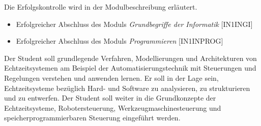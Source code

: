 \begin{course}

\setdoclanguagegerman
{}



\coursehead


\label{cour_6213.dp_997}


\begin{styleenv}
\begin{assessment}
Die Erfolgskontrolle wird in der Modulbeschreibung erläutert.


\end{assessment}

\begin{conditions}\begin{itemize}\item Erfolgreicher Abschluss des Moduls \emph{Grundbegriffe der Informatik} [IN1INGI]  \item Erfolgreicher Abschluss des Moduls \emph{Programmieren} [IN1INPROG]  \end{itemize}\end{conditions}


\end{styleenv}

\begin{learningoutcomes}
Der Student soll grundlegende Verfahren, Modellierungen und Architekturen von Echtzeitsystemen am Beispiel der Automatisierungstechnik mit Steuerungen und Regelungen verstehen und anwenden lernen. Er soll in der Lage sein, Echtzeitsysteme bezüglich Hard- und Software zu analysieren, zu strukturieren und zu entwerfen. Der Student soll weiter in die Grundkonzepte der Echtzeitsysteme, Robotersteuerung, Werkzeugmaschinesteuerung und speicherprogrammierbaren Steuerung eingeführt werden.


\end{learningoutcomes}


\end{course}
